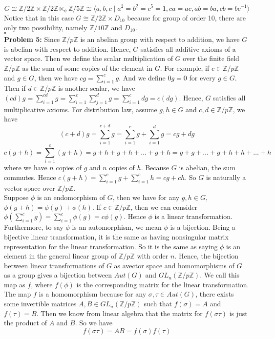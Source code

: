 \documentclass[12pt]{amsart}
\newcommand{\Z}{\mathbb{Z}}
\begin{document}
\[G\cong \Z/2\Z\times \Z/2\Z\ltimes_\psi\Z/5\Z\cong\langle a,b,c \mid a^2=b^2=c^5=1, ca=ac, ab=ba, cb=bc^{-1} \rangle\]
Notice that in this case $G\cong \Z/2\Z\times  D_{10}$ because for group of order 10, there are only two possibility, namely $\Z/10\Z$ and $D_{10}$.
\\\phantom{qed}\hfill$\square$\\
\textbf{Problem 5:} Since $\Z/p\Z$ is an abelian group with respect to addition, we have $G$ is abelian with respect to addition. Hence, $G$ satisfies all additive axioms of a vector space. Then we define the scalar multiplication of $G$ over the finite field $\Z/p\Z$ as the sum of some copies of the element in $G$. For example, if $c\in \Z/p\Z$ and $g\in G$, then we have $cg=\sum_{i=1}^cg$. And we define $0g=0$ for every $g\in G$. Then if $d\in \Z/p\Z$ is another scalar, we have $(cd)g=\sum_{i=1}^{cd}g=\sum_{i=1}^c\sum_{j=1}^dg=\sum_{i=1}^cdg=c(dg)$.  Hence, $G$ satisfies all multiplicative axioms. For distribution law, assume $g,h\in G$ and $c,d\in \Z/p\Z$, we have
\[(c+d)g=\sum_{i=1}^{c+d}g=\sum_{i=1}^cg+\sum_{i=1}^dg=cg+dg\]
\[c(g+h)=\sum_{i=1}^c(g+h)=g+h+g+h+\dots+g+h=g+g+\dots +g+h+h+\dots +h\]
where we have $n$ copies of $g$ and $n$ copies of $h$. Because $G$ is abelian, the sum commutes. Hence $c(g+h)=\sum_{i=1}^cg+\sum_{i=1}^ch=cg+ch$.
So $G$ is naturally a vector space over $\Z/p\Z$.\\
Suppose $\phi$ is an endomorphism of $G$, then we have for any $g,h\in G$, $\phi(g+h)=\phi(g)+\phi(h)$. If $c\in\Z/p\Z$, then we can consider $\phi(\sum_{i=1}^cg)=\sum_{i=1}^c\phi(g)=c\phi(g)$. Hence $\phi$ is a linear transformation.\\
Furthermore, to say $\phi$ is an automorphism, we mean $\phi$ is a bijection. Being a bijective linear transformation, it is the same as having nonsingular matrix representation for the linear transformation. So it is the same as saying $\phi$ is an element in the general linear group of $\Z/p\Z$ with order $n$. Hence, the bijection between linear transformations of $G$ as avector space and homomorphisms of $G$ as a group gives a bijection between $Aut(G)$ and $GL_n(\Z/p\Z)$. We call this map as $f$, where $f(\phi)$ is the corresponding matrix for the linear transformation. The map $f$ is a homomorphism because for any $\sigma, \tau\in Aut(G)$, there exists some invertible matrices $A,B\in GL_n(\Z/p\Z)$ such that $f(\sigma)=A$ and $f(\tau)=B$. Then we know from linear algebra that the matrix for $f(\sigma\tau)$ is just the product of $A$ and $B$. So we have
\[f(\sigma\tau)=AB=f(\sigma)f(\tau)\]
\end{document}
